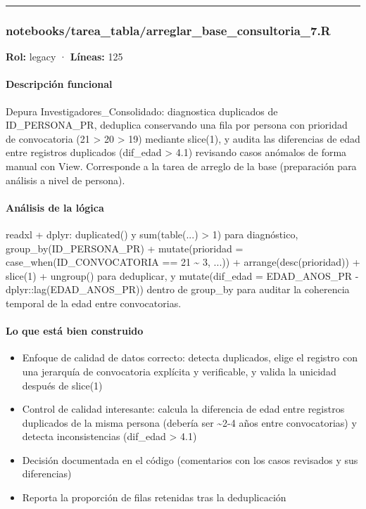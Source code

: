\medskip
\hrule

\subsubsection{notebooks/tarea\_tabla/arreglar\_base\_consultoria\_7.R}
\textbf{Rol:} legacy · \textbf{Líneas:} 125

\paragraph{Descripción funcional}
Depura Investigadores\_Consolidado: diagnostica duplicados de ID\_PERSONA\_PR, deduplica conservando una fila por persona con prioridad de convocatoria (21 > 20 > 19) mediante slice(1), y audita las diferencias de edad entre registros duplicados (dif\_edad > 4.1) revisando casos anómalos de forma manual con View. Corresponde a la tarea de arreglo de la base (preparación para análisis a nivel de persona).

\paragraph{Análisis de la lógica}
readxl + dplyr: duplicated() y sum(table(...) > 1) para diagnóstico, group\_by(ID\_PERSONA\_PR) + mutate(prioridad = case\_when(ID\_CONVOCATORIA == 21 \textasciitilde{} 3, ...)) + arrange(desc(prioridad)) + slice(1) + ungroup() para deduplicar, y mutate(dif\_edad = EDAD\_ANOS\_PR - dplyr::lag(EDAD\_ANOS\_PR)) dentro de group\_by para auditar la coherencia temporal de la edad entre convocatorias.

\paragraph{Lo que está bien construido}
\begin{itemize}
  \item Enfoque de calidad de datos correcto: detecta duplicados, elige el registro con una jerarquía de convocatoria explícita y verificable, y valida la unicidad después de slice(1)
  \item Control de calidad interesante: calcula la diferencia de edad entre registros duplicados de la misma persona (debería ser \textasciitilde{}2-4 años entre convocatorias) y detecta inconsistencias (dif\_edad > 4.1)
  \item Decisión documentada en el código (comentarios con los casos revisados y sus diferencias)
  \item Reporta la proporción de filas retenidas tras la deduplicación
\end{itemize}

